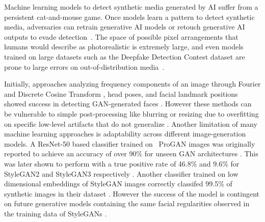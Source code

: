 Machine learning models to detect synthetic media generated by AI suffer from a persistent cat-and-mouse game. Once models learn a pattern to detect synthetic media, adversaries can retrain generative AI models or retouch generative AI outputs to evade detection~\cite{schaul_2024}. The space of possible pixel arrangements that humans would describe as photorealistic is extremely large,  and even models trained on large datasets such as the Deepfake Detection Contest dataset are prone to large errors on out-of-distribution media~\cite{deepfakedetectionbyhumancrowds}. 


Initially, approaches analyzing frequency components of an image through Fourier and Discrete Cosine Transform \cite{marra2018gansleaveartificialfingerprints, yu2019attributingfakeimagesgans, 9035107, durall2020watchupconvolutioncnnbased, bi2023detectinggeneratedimagesreal, pmlr-v119-frank20a}, head poses, and facial landmark positions  \cite{yang2018exposingdeepfakesusing, yang2019exposinggansynthesizedfacesusing} showed success in detecting GAN-generated faces . However these methods can be vulnerable to simple post-processing like blurring or resizing due to overfitting on specific low-level artifacts that do not generalize \cite{9879575}. Another limitation of many machine learning approaches is adaptability across different image-generation models. A ResNet-50 based classifier trained on \ ProGAN images was originally reported to achieve an accuracy of over 90\% for unseen GAN architectures \cite{wang2020cnn}. This was later shown to perform with a true positive rate of 46.8\% and 9.6\% for StyleGAN2 and StyleGAN3 respectively \cite{Mundra_2023_CVPR}. Another classifier trained on low dimensional embeddings of StyleGAN images correctly classifed 99.5\% of synthetic images in their dataset  \cite{Mundra_2023_CVPR}. However the success of the model is contingent on future generative models containing the same facial regularities observed in the training data of StyleGANs \cite{Mundra_2023_CVPR}. 


